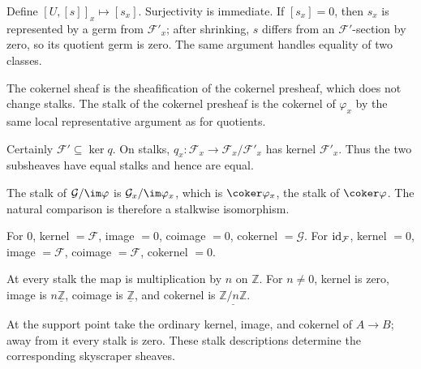 \begin{solution}[Exercise 9]
Define $[U,[s]]_x\mapsto[s_x]$. Surjectivity is immediate. If $[s_x]=0$, then $s_x$ is represented by a germ from $\mathcal F'_x$; after shrinking, $s$ differs from an $\mathcal F'$-section by zero, so its quotient germ is zero. The same argument handles equality of two classes.
\end{solution}

\begin{solution}[Exercise 10]
The cokernel sheaf is the sheafification of the cokernel presheaf, which does not change stalks. The stalk of the cokernel presheaf is the cokernel of $\varphi_x$ by the same local representative argument as for quotients.
\end{solution}

\begin{solution}[Exercise 11]
Certainly $\mathcal F'\subseteq\ker q$. On stalks, $q_x:\mathcal F_x\to\mathcal F_x/\mathcal F'_x$ has kernel $\mathcal F'_x$. Thus the two subsheaves have equal stalks and hence are equal.
\end{solution}

\begin{solution}[Exercise 12]
The stalk of $\mathcal G/\im\varphi$ is $\mathcal G_x/\im\varphi_x$, which is $\coker\varphi_x$, the stalk of $\coker\varphi$. The natural comparison is therefore a stalkwise isomorphism.
\end{solution}

\begin{solution}[Exercise 13]
For $0$, kernel $=\mathcal F$, image $=0$, coimage $=0$, cokernel $=\mathcal G$. For $\operatorname{id}_\mathcal F$, kernel $=0$, image $=\mathcal F$, coimage $=\mathcal F$, cokernel $=0$.
\end{solution}

\begin{solution}[Exercise 14]
At every stalk the map is multiplication by $n$ on $\mathbb Z$. For $n\neq0$, kernel is zero, image is $n\underline{\mathbb Z}$, coimage is $\underline{\mathbb Z}$, and cokernel is $\underline{\mathbb Z/n\mathbb Z}$.
\end{solution}

\begin{solution}[Exercise 15]
At the support point take the ordinary kernel, image, and cokernel of $A\to B$; away from it every stalk is zero. These stalk descriptions determine the corresponding skyscraper sheaves.
\end{solution}

